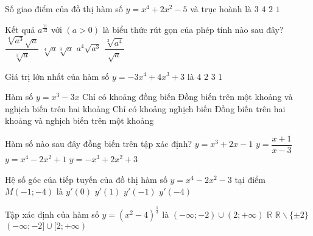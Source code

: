 \begin{ex}%
Số giao điểm của đồ thị hàm số $y=x^4+2x^2-5$ và trục hoành là
\choice
{$3$}
{$4$}
{\True $2$}
{$1$}
\end{ex}

\begin{ex}%
Kết quả $a^{\frac{11}{12}}$ với $(a>0)$ là biểu thức rút gọn của phép tính nào sau đây?
\choice
{\True $\dfrac{\sqrt[4]{a^3}\sqrt{a}}{\sqrt[3]{a}}$}
{$\sqrt[4]{a}\sqrt[3]{a}$}
{$a^4\sqrt{a^3}$}
{$\dfrac{\sqrt[3]{a^4}}{\sqrt{a}}$}
\end{ex}

\begin{ex}%
Giá trị lớn  nhất của hàm số $y=-3x^4+4x^3+3$ là
\choice
{\True $4$}
{$2$}
{$3$}
{$1$}
\end{ex}

\begin{ex}%
Hàm số $y=x^3-3x$
\choice
{Chỉ có khoảng đồng biến}
{Đồng biến trên một khoảng và nghịch biến trên hai khoảng}
{Chỉ có khoảng nghịch biến}
{\True Đồng biến trên hai khoảng và nghịch biến trên một khoảng}
\end{ex}

\begin{ex}%
Hàm số nào sau đây đồng biến trên tập xác định?
\choice
{\True $y=x^3+2x-1$}
{$y=\dfrac{x+1}{x-3}$}
{$y=x^4-2x^2+1$}
{$y=-x^3+2x^2+3$}
\end{ex}


\begin{ex}%
Hệ số góc của tiếp tuyến của đồ thị hàm số $y=x^4-2x^2-3$ tại điểm $M(-1;-4)$ là
\choice
{$y'(0)$}
{$y'(1)$}
{\True $y'(-1)$}
{$y'(-4)$}
\end{ex}

\begin{ex}%
Tập xác định của hàm số $y=(x^2-4)^{\frac{1}{3}}$ là
\choice
{\True $(-\infty;-2)\cup (2;+\infty)$}
{$\mathbb{R}$}
{$\mathbb{R}\backslash \{\pm 2\}$}
{$(-\infty;-2]\cup [2;+\infty)$}
\end{ex}

